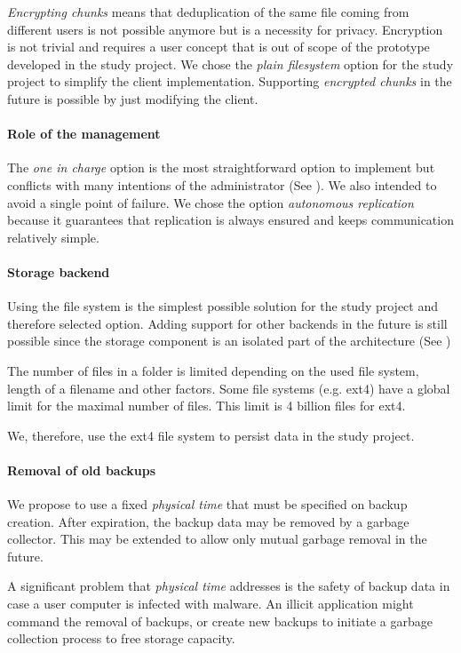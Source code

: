 \emph{Encrypting chunks} means that deduplication of the same file coming from different users is not possible anymore but is a necessity for privacy. Encryption is not trivial and requires a user concept that is out of scope of the prototype developed in the study project.
We chose the \emph{plain filesystem} option for the study project to simplify the client implementation. Supporting \emph{encrypted chunks} in the future is possible by just modifying the client.

\paragraph{Role of the management}
The \emph{one in charge} option is the most straightforward option to implement but conflicts with many intentions of the administrator (See ). We also intended to avoid a single point of failure. We chose the option \emph{autonomous replication} because it guarantees that replication is always ensured and keeps communication relatively simple.

\paragraph{Storage backend}
Using the file system is the simplest possible solution for the study project and therefore selected option. Adding support for other backends in the future is still possible since the storage component is an isolated part of the architecture (See )

The number of files in a folder is limited depending on the used file system, length of a filename and other factors. Some file systems (e.g. ext4) have a global limit for the maximal number of files. This limit is 4 billion files for ext4. \cite{ext4}

We, therefore, use the ext4 file system to persist data in the study project.

\paragraph{Removal of old backups}\label{sec:removal-of-old-backups}
We propose to use a fixed \emph{physical time} that must be specified on backup creation. After expiration, the backup data may be removed by a garbage collector. This may be extended to allow only mutual garbage removal in the future.

A significant problem that \emph{physical time} addresses is the safety of backup data in case a user computer is infected with malware. An illicit application might command the removal of backups, or create new backups to initiate a garbage collection process to free storage capacity.

